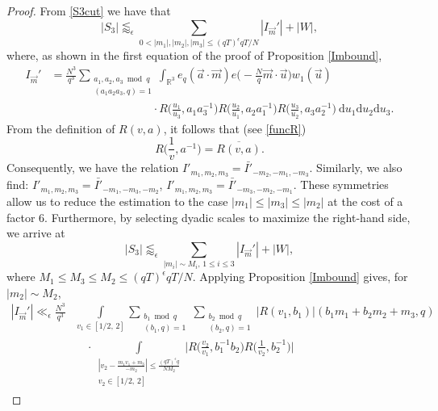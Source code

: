 \documentclass[12pt]{amsart}
\theoremstyle{definition}
\theoremstyle{plain}
\theoremstyle{remark}
\numberwithin{equation}{section}
\numberwithin{theorem}{section}
\numberwithin{equation}{section}
\begin{document}
	\begin{proof}
		From \eqref{S3cut} we have that
		\[|S_{3}|\lessapprox_{\epsilon} \sum_{0<|m_{1}|, |m_{2}|, |m_{3}|\leq (qT)^{\epsilon}qT/N}|I_{\overrightarrow{m}}'|+|W|,\]
		where, as shown in the first equation of the proof of Proposition \ref{Imbound},
		\begin{align*}
			I_{\overrightarrow{m}}'
			&=\frac{N^{3}}{q^{3}}\sum_{\substack{a_1,a_2,a_3 \bmod q \\ (a_1a_2a_3,q)=1}}\int_{\mathbb{R}^{3}}e_q(\overrightarrow{a}\cdot\overrightarrow{m})
			e\bigg(-\frac{N}{q}\overrightarrow{m}\cdot\overrightarrow{u}\bigg)w_{1}(\overrightarrow{u})
			\\
			&\quad \quad \quad\quad \quad \quad\quad \quad \quad\cdot R\bigg(\frac{u_{1}}{u_{3}}, a_{1}a_{3}^{-1}\bigg)R\bigg(\frac{u_{2}}{u_{1}}, a_{2}a_{1}^{-1}\bigg)R\bigg(\frac{u_{3}}{u_{2}}, a_{3}a_{2}^{-1}\bigg)\:\mathrm{d}u_{1}\mathrm{d}u_{2}\mathrm{d}u_{3}.
		\end{align*}
		From the definition of $R(v,a)$,  it follows that (see \eqref{funcR})
		\[R\bigg(\frac{1}{v}, a^{-1}\bigg)=\overline{R(v,a)}.\]
		Consequently, we have the relation $I'_{m_{1},m_{2},m_{3}}=\bar{I'}_{-m_{2},-m_{1},-m_{3}}$. Similarly, we also find: $I'_{m_{1},m_{2},m_{3}}=\bar{I'}_{-m_{1},-m_{3},-m_{2}}$, $I'_{m_{1},m_{2},m_{3}}=\bar{I'}_{-m_{3},-m_{2},-m_{1}}$. 
		These symmetries allow us to reduce the estimation to the case $|m_{1}|\leq |m_{3}|\leq |m_{2}|$ at the cost of a factor $6$. Furthermore, by selecting dyadic scales to maximize the right-hand side, we arrive at
		\begin{equation}\label{trsdyas3}
			|S_{3}|\lessapprox_{\epsilon} \sum_{|m_{i}|\sim M_{i}, \, 1\leq i \leq 3} |I_{\overrightarrow{m}}'|+|W|,
		\end{equation}
		where $M_{1}\leq M_{3}\leq M_{2}\leq (qT)^{\epsilon}qT/N$.
		Applying Proposition \ref{Imbound} gives, for $|m_{2}|\sim M_{2}$,
		\begin{align*}
			|I_{\overrightarrow{m}}'|\ll_{\epsilon} \frac{N^{3}}{q^{3}}&\int\limits_{ v_{1} \in [1/2,\, 2]}\sum_{\substack{b_1 \bmod q \\ (b_{1}, q)=1}}\sum_{\substack{b_2 \bmod q \\ (b_{2}, q)=1}}|R(v_{1}, b_{1})|(b_{1}m_{1}+b_{2}m_{2}+m_{3},q)
			\\
			&\quad\cdot\int\limits_{\substack{|v_{2}-\frac{m_{1}v_{1}+m_{3}}{-m_{2}}|\leq \frac{(qT)^{\epsilon}q}{NM_{2}} \\ v_{2} \in [1/2,\, 2]}}\bigg| R\bigg(\frac{v_{2}}{v_{1}}, b_{1}^{-1}b_{2}\bigg)R\bigg(\frac{1}{v_{2}}, b_{2}^{-1}\bigg)\bigg|

\end{align*}
\end{proof}
\end{document}

